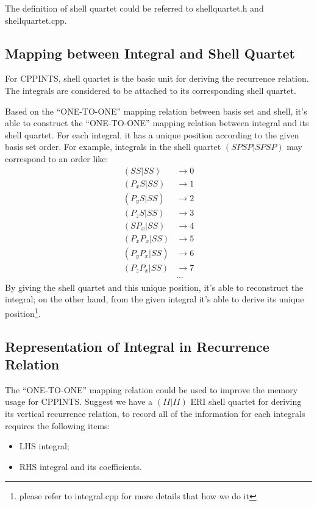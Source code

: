 The definition of shell quartet could be referred to shellquartet.h
and shellquartet.cpp.

\subsection{Mapping between Integral and Shell Quartet}
\label{mapping_integral_sq}

For CPPINTS, shell quartet is the basic unit for deriving the 
recurrence relation. The integrals are considered to be attached to 
its corresponding shell quartet.

Based on the ``ONE-TO-ONE'' mapping relation between basis set 
and shell, it's able to construct the ``ONE-TO-ONE'' mapping relation
between integral and its shell quartet. For each integral, it 
has a unique position according to the given basis set order.
For example, integrals in the shell quartet $(SPSP|SPSP)$ may 
correspond to an order like:
\begin{align}
 (SS|SS)         &\rightarrow  0 \nonumber \\
 (P_{x}S|SS)     &\rightarrow  1 \nonumber \\
 (P_{y}S|SS)     &\rightarrow  2 \nonumber \\
 (P_{z}S|SS)     &\rightarrow  3 \nonumber \\
 (SP_{x}|SS)     &\rightarrow  4 \nonumber \\
 (P_{x}P_{x}|SS) &\rightarrow  5 \nonumber \\
 (P_{y}P_{x}|SS) &\rightarrow  6 \nonumber \\
 (P_{z}P_{x}|SS) &\rightarrow  7 \nonumber \\
                 &\cdots
\end{align}
By giving the shell quartet and this unique position, it's able 
to reconstruct the integral; on the other hand, from the given 
integral it's able to derive its unique position\footnote{please
refer to integral.cpp for more details that how we do it}.

\subsection{Representation of Integral in Recurrence Relation}
%
%
\label{representation_integral_sq}

The ``ONE-TO-ONE'' mapping relation could be used to improve the memory 
usage for CPPINTS. Suggest we have a $(II|II)$ ERI shell 
quartet for deriving its vertical recurrence relation, to record
all of the information for each integrals requires the following 
items:
\begin{itemize}
 \item LHS integral;
 \item RHS integral and its coefficients.
\end{itemize}

